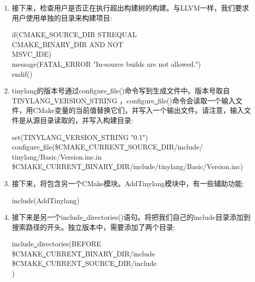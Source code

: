 \begin{enumerate}
\item 接下来，检查用户是否正在执行超出构建树的构建。与LLVM一样，我们要求用户使用单独的目录来构建项目:
\begin{tcolorbox}[colback=white,colframe=black]
if(CMAKE\underline{~}SOURCE\underline{~}DIR STREQUAL \\  \hspace*{0.3cm}CMAKE\underline{~}BINARY\underline{~}DIR AND NOT \\ \hspace*{0.3cm}MSVC\underline{~}IDE) \\
	\hspace*{0.5cm}message(FATAL\underline{~}ERROR "In-source builds are not allowed.") \\
endif()
\end{tcolorbox}
 
\item tinylang的版本号通过configure\underline{~}file()命令写到生成文件中。版本号取自TINYLANG\underline{~}VER\allowbreak SION\underline{~}STRING ，configure\underline{~}file()命令会读取一个输入文件，用CMake变量的当前值替换它们，并写入一个输出文件。请注意，输入文件是从源目录读取的，并写入构建目录:
\begin{tcolorbox}[colback=white,colframe=black]
set(TINYLANG\underline{~}VERSION\underline{~}STRING "0.1") \\
	configure\underline{~}file(\${CMAKE\underline{~}CURRENT\underline{~}SOURCE\underline{~}DIR}/include/ \\
	\hspace*{0.5cm}tinylang/Basic/Version.inc.in \\
\${CMAKE\underline{~}CURRENT\underline{~}BINARY\underline{~}DIR}/include/tinylang/Basic/Version.inc)
\end{tcolorbox}

\item 接下来，将包含另一个CMake模块。AddTinylang模块中，有一些辅助功能:
\begin{tcolorbox}[colback=white,colframe=black]
	include(AddTinylang)
\end{tcolorbox}
 
\item 接下来是另一个include\underline{~}directories()语句。将把我们自己的include目录添加到搜索路径的开头。独立版本中，需要添加了两个目录:
\begin{tcolorbox}[colback=white,colframe=black]
include\underline{~}directories(BEFORE \\
\hspace*{0.5cm}\${CMAKE\underline{~}CURRENT\underline{~}BINARY\underline{~}DIR}/include \\
\hspace*{0.5cm}\${CMAKE\underline{~}CURRENT\underline{~}SOURCE\underline{~}DIR}/include \\
)
\end{tcolorbox}
 

\end{enumerate}
